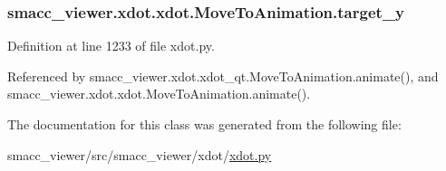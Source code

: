 \subsubsection[{\texorpdfstring{target\+\_\+y}{target_y}}]{\setlength{\rightskip}{0pt plus 5cm}smacc\+\_\+viewer.\+xdot.\+xdot.\+Move\+To\+Animation.\+target\+\_\+y}\hypertarget{classsmacc__viewer_1_1xdot_1_1xdot_1_1MoveToAnimation_af354769fa237bb3f62cf02d9ca92da4f}{}\label{classsmacc__viewer_1_1xdot_1_1xdot_1_1MoveToAnimation_af354769fa237bb3f62cf02d9ca92da4f}


Definition at line 1233 of file xdot.\+py.



Referenced by smacc\+\_\+viewer.\+xdot.\+xdot\+\_\+qt.\+Move\+To\+Animation.\+animate(), and smacc\+\_\+viewer.\+xdot.\+xdot.\+Move\+To\+Animation.\+animate().



The documentation for this class was generated from the following file\+:\begin{DoxyCompactItemize}
\item 
smacc\+\_\+viewer/src/smacc\+\_\+viewer/xdot/\hyperlink{xdot_8py}{xdot.\+py}\end{DoxyCompactItemize}

